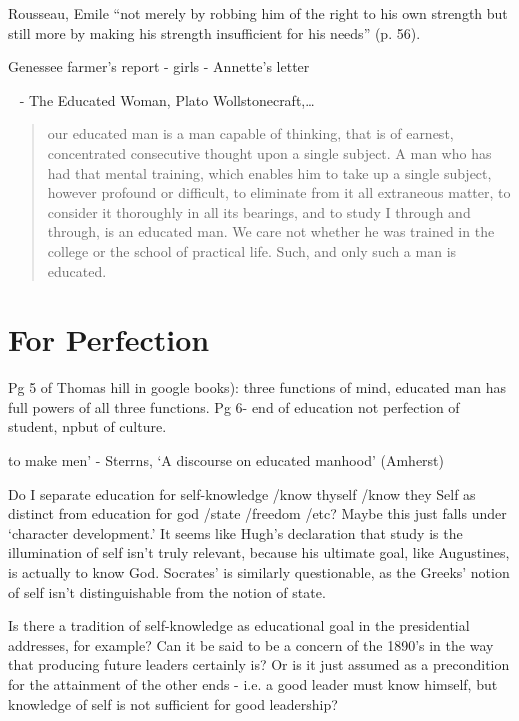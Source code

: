 Rousseau, Emile ``not merely by robbing him of the right to his own strength but still more by making his strength insufficient for his needs'' (p. 56).

Genessee farmer's report - girls - Annette's letter

~\citep{Martin:1987uf} - The Educated Woman, Plato Wollstonecraft,{\ldots} 

\begin{quote}

our educated man is a man capable of thinking, that is of earnest, concentrated consecutive thought upon a single subject. A man who has had that mental training, which enables him to take up a single subject, however profound or difficult, to eliminate from it all extraneous matter, to consider it thoroughly in all its bearings, and to study I through and through, is an educated man. We care not whether he was trained in the college or the school of practical life. Such, and only such a man is educated. ~\citep[P. 307]{:1859ts}
\end{quote}

\section{For Perfection}
\label{forperfection}

Pg 5 of Thomas hill in google books): three functions of mind, educated man has full powers of all three functions.
Pg 6- end of education not perfection of student, npbut of culture.

to make men' - Sterrns, `A discourse on educated manhood' (Amherst)

Do I separate education for self-knowledge \slash  know thyself \slash  know they Self as distinct from education for god \slash  state \slash  freedom \slash  etc? Maybe this just falls under `character development.'
 It seems like Hugh's declaration that study is the illumination of self isn't truly relevant, because his ultimate goal, like Augustines, is actually to know God. Socrates' is similarly questionable, as the Greeks' notion of self isn't distinguishable from the notion of state.

Is there a tradition of self-knowledge as educational goal in the presidential addresses, for example? Can it be said to be a concern of the 1890's in the way that producing future leaders certainly is? Or is it just assumed as a precondition for the attainment of the other ends - i.e. a good leader must know himself, but knowledge of self is not sufficient for good leadership? 

